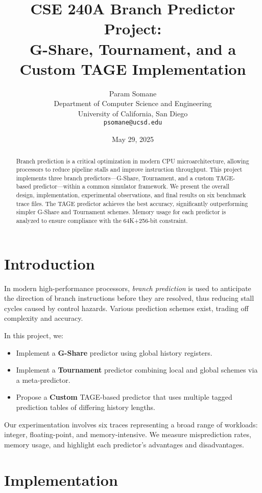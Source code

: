 \documentclass[11pt]{article}
\title{CSE 240A Branch Predictor Project:\\
G-Share, Tournament, and a Custom TAGE Implementation}
\author{%
  Param Somane \\
  Department of Computer Science and Engineering \\
  University of California, San Diego \\
  \texttt{psomane@ucsd.edu}
}
\date{May 29, 2025}
\begin{document}
\maketitle

\begin{abstract}
Branch prediction is a critical optimization in modern CPU microarchitecture, allowing processors to reduce pipeline stalls and improve instruction throughput. This project implements three branch predictors---G-Share, Tournament, and a custom TAGE-based predictor---within a common simulator framework. We present the overall design, implementation, experimental observations, and final results on six benchmark trace files. The TAGE predictor achieves the best accuracy, significantly outperforming simpler G-Share and Tournament schemes. Memory usage for each predictor is analyzed to ensure compliance with the 64K+256-bit constraint.
\end{abstract}

\vspace{1em}

\section{Introduction}
In modern high-performance processors, \emph{branch prediction} is used to anticipate the direction of branch instructions before they are resolved, thus reducing stall cycles caused by control hazards. Various prediction schemes exist, trading off complexity and accuracy.

In this project, we:
\begin{itemize}
    \item Implement a \textbf{G-Share} predictor using global history registers.
    \item Implement a \textbf{Tournament} predictor combining local and global schemes via a meta-predictor.
    \item Propose a \textbf{Custom} TAGE-based predictor that uses multiple tagged prediction tables of differing history lengths.
\end{itemize}
Our experimentation involves six traces representing a broad range of workloads: integer, floating-point, and memory-intensive. We measure misprediction rates, memory usage, and highlight each predictor's advantages and disadvantages.

\section{Implementation}
\end{document}
